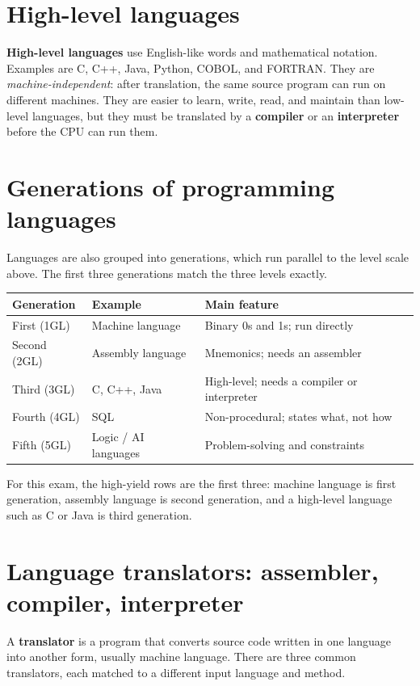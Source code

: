 \section{High-level languages}
\textbf{High-level languages} use English-like words and mathematical
notation. Examples are C, C++, Java, Python, COBOL, and FORTRAN. They are
\emph{machine-independent}: after translation, the same source program can run
on different machines. They are easier to learn, write, read, and maintain
than low-level languages, but they must be translated by a \textbf{compiler}
or an \textbf{interpreter} before the CPU can run them.

\section{Generations of programming languages}
Languages are also grouped into generations, which run parallel to the level
scale above. The first three generations match the three levels exactly.

\begin{center}
\begin{tabular}{p{}p{}p{}}
\toprule
\textbf{Generation} & \textbf{Example} & \textbf{Main feature} \\
\midrule
First (1GL) & Machine language & Binary 0s and 1s; run directly \\
Second (2GL) & Assembly language & Mnemonics; needs an assembler \\
Third (3GL) & C, C++, Java & High-level; needs a compiler or interpreter \\
Fourth (4GL) & SQL & Non-procedural; states what, not how \\
Fifth (5GL) & Logic / AI languages & Problem-solving and constraints \\
\bottomrule
\end{tabular}
\end{center}

For this exam, the high-yield rows are the first three: machine language is
first generation, assembly language is second generation, and a high-level
language such as C or Java is third generation.

\section{Language translators: assembler, compiler, interpreter}
A \textbf{translator} is a program that converts source code written in one
language into another form, usually machine language. There are three common
translators, each matched to a different input language and method.

